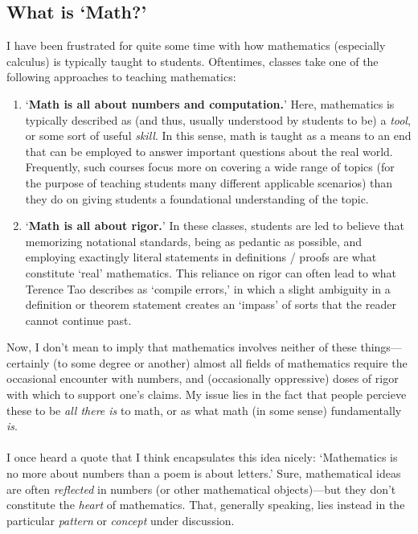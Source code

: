 \documentclass[10pt]{article}
\theoremstyle{definition}
\begin{document}
{\subsection{What is `Math?'}
I have been frustrated for quite some time with how mathematics
(especially calculus) is typically taught to students.  Oftentimes,
classes take one of the following approaches to teaching mathematics:
\begin{enumerate}
    \item `\textbf{Math is all about numbers and computation.}'  Here,
      mathematics is typically described as (and thus, usually
      understood by students to be) a \emph{tool}, or some sort of
      useful \emph{skill}.  In this sense, math is taught as a means
      to an end that can be employed to answer important questions
      about the real world.  Frequently, such courses focus more on
      covering a wide range of topics (for the purpose of teaching
      students many different applicable scenarios) than they do on
      giving students a foundational understanding of the topic.
    \item `\textbf{Math is all about rigor.}'  In these classes,
      students are led to believe that memorizing notational
      standards, being as pedantic as possible, and employing
      exactingly literal statements in definitions / proofs are what
      constitute `real' mathematics.  This reliance on rigor can often
      lead to what Terence Tao describes as `compile errors,' in which
      a slight ambiguity in a definition or theorem statement creates
      an `impass' of sorts that the reader cannot continue past.
\end{enumerate}
Now, I don't mean to imply that mathematics involves neither of these
things---certainly (to some degree or another) almost all fields of
mathematics require the occasional encounter with numbers, and
(occasionally oppressive) doses of rigor with which to support one's
claims.  My issue lies in the fact that people percieve these to be
\emph{all there is} to math, or as what math (in some sense)
fundamentally \emph{is}.\\~\\
I once heard a quote that I think encapsulates this idea nicely:
`Mathematics is no more about numbers than a poem is about letters.'
Sure, mathematical ideas are often \emph{reflected} in numbers (or
other mathematical objects)---but they don't constitute the
\emph{heart} of mathematics.  That, generally speaking, lies instead
in the particular \emph{pattern} or \emph{concept} under discussion.
}
\end{document}
